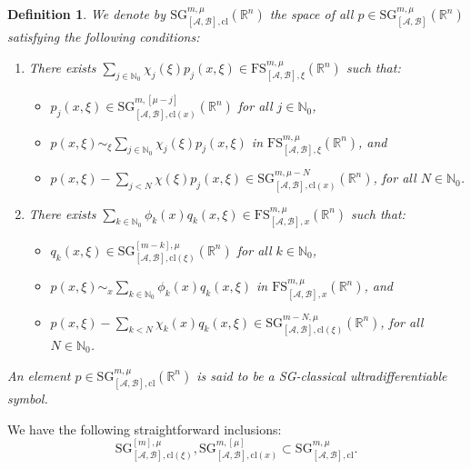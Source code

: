 \documentclass[11pt,reqno]{amsart}
\numberwithin{equation}{section}
\newtheorem{definition}[theorem]{Definition}
\newcommand{\R}{{\mathbb{R}}} %
\newcommand{\N}{{\mathbb{N}}} %
\newcommand{\SG}{{\mathrm{SG}}}
\newcommand{\FS}{{\mathrm{FS}}}
\newcommand{\A}{{\mathcal{A}}} %
\newcommand{\B}{{\mathcal{B}}} %
\begin{document}
\begin{definition}\label{def:classical_symbols}
	We denote by ${\SG}_{[\A,\B],\mathrm{cl}}^{m,\mu}(\R^n)$ the space of all $p\in {\SG}_{[\A,\B]}^{m,\mu}(\R^n)$ satisfying the following conditions:
	\begin{enumerate}
		\item[$(I)$] There exists $\sum_{j\in\N_0}\chi_j(\xi)p_j(x,\xi)\in \FS_{[\A,\B],\xi}^{m,\mu}(\R^n)$ such that:
		\begin{itemize}
			\item $p_j(x,\xi)\in {\SG}_{[\A,\B],\mathrm{cl}(x)}^{m,[\mu-j]}(\R^n)$ for all $j\in\N_0$,
			
			\item $p(x,\xi)\sim_\xi \sum_{j\in\N_0}\chi_j(\xi)p_j(x,\xi)$ in $\FS_{[\A,\B],\xi}^{m,\mu}(\R^n)$, and
			
			\item $p(x,\xi)-\sum_{j<N}\chi(\xi)p_j(x,\xi)\in {\SG}_{[\A,\B],\mathrm{cl}(x)}^{m,\mu-N}(\R^n)$, for all $N\in\N_0$.
		\end{itemize}
		
		\medskip
		
		\item[$(II)$] There exists $\sum_{k\in\N_0}\phi_k(x)q_k(x,\xi)\in \FS_{[\A,\B],x}^{m,\mu}(\R^n)$ such that:
		\begin{itemize}
			\item $q_k(x,\xi)\in {\SG}_{[\A,\B],\mathrm{cl}(\xi)}^{[m-k],\mu}(\R^n)$ for all $k\in\N_0$,
			
			\item $p(x,\xi)\sim_x \sum_{k\in\N_0}\phi_k(x)q_k(x,\xi)$ in $\FS_{[\A,\B],x}^{m,\mu}(\R^n)$, and
			
			\item $p(x,\xi)-\sum_{k<N}\chi_k(x)q_k(x,\xi)\in {\SG}_{[\A,\B],\mathrm{cl}(\xi)}^{m-N,\mu}(\R^n)$, for all $N\in\N_0$.
		\end{itemize}   
	\end{enumerate}
	
	An element $p\in {\SG}_{[\A,\B],\mathrm{cl}}^{m,\mu}(\R^n)$ is said to be a SG-classical ultradifferentiable symbol.
\end{definition}

We have the following straightforward inclusions:
%
\begin{equation}\label{incl_cl_SG}
	{\SG}_{[\A,\B],\mathrm{cl}(\xi)}^{[m],\mu}, {\SG}_{[\A,\B],\mathrm{cl}(x)}^{m,[\mu]} \subset {\SG}_{[\A,\B],\mathrm{cl}}^{m,\mu}.
\end{equation}
\end{document}
